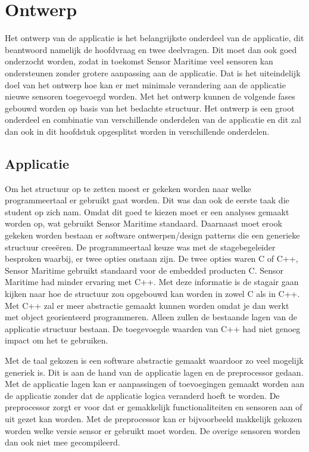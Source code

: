 \section{Ontwerp}
Het ontwerp van de applicatie is het belangrijkste onderdeel van de applicatie, dit beantwoord namelijk de hoofdvraag en twee deelvragen. Dit moet dan ook goed onderzocht worden, zodat in toekomst Sensor Maritime veel sensoren kan ondersteunen zonder grotere aanpassing aan de applicatie. Dat is het uiteindelijk doel van het ontwerp hoe kan er met minimale verandering aan de applicatie nieuwe sensoren toegevoegd worden. Met het ontwerp kunnen de volgende fases gebouwd worden op basis van het bedachte structuur. Het ontwerp is een groot onderdeel en combinatie van verschillende onderdelen van de applicatie en dit zal dan ook in dit hoofdstuk opgesplitst worden in verschillende onderdelen.

\subsection{Applicatie}
Om het structuur op te zetten moest er gekeken worden naar welke programmeertaal er gebruikt gaat worden. Dit was dan ook de eerste taak die student op zich nam. Omdat dit goed te kiezen moet er een analyses gemaakt worden op, wat gebruikt Sensor Maritime standaard. Daarnaast moet erook gekeken worden bestaan er software ontwerpen/design patterns die een generieke structuur creeëren. De programmeertaal keuze was met de stagebegeleider besproken waarbij, er twee opties onstaan zijn. De twee opties waren C of C++, Sensor Maritime gebruikt standaard voor de embedded producten C. Sensor Maritime had minder ervaring met C++. Met deze informatie is de stagair gaan kijken naar hoe de structuur zou opgebouwd kan worden in zowel C als in C++. Met C++ zal er meer abstractie gemaakt kunnen worden omdat je dan werkt met object georienteerd programmeren. Alleen zullen de bestaande lagen van de applicatie structuur bestaan. De toegevoegde waarden van C++ had niet genoeg impact om het te gebruiken. \newline

\noindent Met de taal gekozen is een software abstractie gemaakt waardoor zo veel mogelijk generiek is. Dit is aan de hand van de applicatie lagen en de preprocessor gedaan. Met de applicatie lagen kan er aanpassingen of toevoegingen gemaakt worden aan de applicatie zonder dat de applicatie logica veranderd hoeft te worden. De preprocessor zorgt er voor dat er gemakkelijk functionaliteiten en sensoren aan of uit gezet kan worden. Met de preprocessor kan er bijvoorbeeld makkelijk gekozen worden welke versie sensor er gebruikt moet worden. De overige sensoren worden dan ook niet mee gecompileerd.

